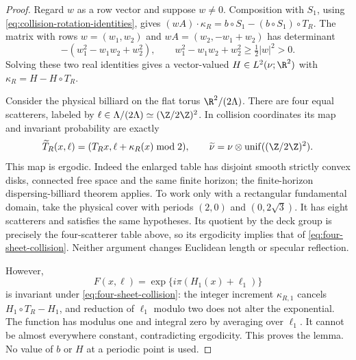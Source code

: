 \begin{proof}
Regard $w$ as a row vector and suppose $w\ne0$.
Composition with $S_1$, using \eqref{eq:collision-rotation-identities},
gives $(wA)\cdot\kappa_R=b\circ S_1-(b\circ S_1)\circ T_R$.
The matrix with rows $w=(w_1,w_2)$ and
$wA=(w_2,-w_1+w_2)$ has determinant
\begin{equation}\label{eq:spatial-rotation-determinant}
 -(w_1^2-w_1w_2+w_2^2),
 \qquad w_1^2-w_1w_2+w_2^2\ge\tfrac12|w|^2>0.
\end{equation}
Solving these two real identities gives a vector-valued
$H\in L^2(\nu;\R^2)$ with $\kappa_R=H-H\circ T_R$.

Consider the physical billiard on the flat torus $\R^2/(2\Lambda)$.
There are four equal scatterers, labeled by
$\ell\in\Lambda/(2\Lambda)\simeq(\Z/2\Z)^2$. In collision
coordinates its map and invariant probability are exactly
\begin{equation}\label{eq:four-sheet-collision}
 \widetilde T_R(x,\ell)
       =(T_Rx,\ell+\kappa_R(x)\bmod2),\qquad
 \widetilde\nu=\nu\otimes\operatorname{unif}((\Z/2\Z)^2).
\end{equation}
This map is ergodic. Indeed the enlarged table has disjoint smooth
strictly convex disks, connected free space and the same finite
horizon; the finite-horizon dispersing-billiard theorem
\cite[Section 8.1, Theorem 6]{Young} applies. To work only with a
rectangular fundamental domain, take the physical cover with periods
$(2,0)$ and $(0,2\sqrt3)$. It has eight scatterers and satisfies the
same hypotheses. Its quotient by the deck group is precisely the
four-scatterer table above, so its ergodicity implies that of
\eqref{eq:four-sheet-collision}. Neither argument changes Euclidean
length or specular reflection.

However,
\[
 F(x,\ell)=\exp\{i\pi(H_1(x)+\ell_1)\}
\]
is invariant under \eqref{eq:four-sheet-collision}: the integer
increment $\kappa_{R,1}$ cancels $H_1\circ T_R-H_1$, and reduction
of $\ell_1$ modulo two does not alter the exponential. The function
has modulus one and integral zero by averaging over $\ell_1$.
It cannot be almost everywhere constant, contradicting ergodicity.
This proves the lemma. No value of $b$ or $H$ at a periodic point is
used.
\end{proof}

